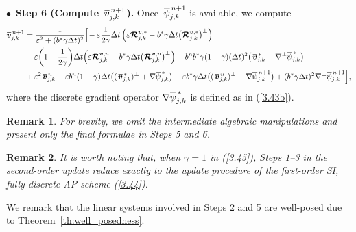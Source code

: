 \documentclass[a4paper,11pt,twoside]{article}
\newtheorem{rmk}{Remark}[section]
\numberwithin{equation}{section}
\numberwithin{figure}{section}
\numberwithin{table}{section}
\newcommand{\eps}{\varepsilon}
\newcommand{\dt}{\Delta t}
\newcommand{\bv}{\bm{v}}
\newcommand\eref[1]{(\ref{#1})}
\newcommand*\xbar[1]{%
	\hbox{%
		\vbox{%
			\hrule height 0.5pt %
			\kern0.3ex%
			\hbox{%
				\kern-0.05em%
				\ensuremath{#1}%
				\kern-0.02em%
			}%
		}%
	}%
}
\begin{document}
\smallskip
\noindent
$\bullet\,$ \textbf{Step 6 (Compute $\,\xbar{\bv}^{\,n+1}_{j,k}$).} Once $\,\xbar\psi^{\,n+1}_{j,k}$ is available, we compute
\begin{equation*}
\begin{aligned}
\xbar{\bv}^{\,n+1}_{j,k}&=\frac{1}{\eps^2+(b^*\gamma\dt)^2}\Big[\!-\eps\frac{1}{2\gamma}\dt\left(\eps\bm{{\cal R}}^{\bv,*}_{j,k}
-b^*\gamma\dt\big(\bm{{\cal R}}^{\bv,*}_{j,k}\big)^\perp\right)\\
&-\eps\bigg(1-\frac{1}{2\gamma}\bigg)\dt\Big(\eps\bm{{\cal R}}^{\bv,n}_{j,k}-b^*\gamma\dt\big(\bm{{\cal R}}^{\bv,n}_{j,k}\big)^\perp\Big)
-b^nb^*\gamma(1-\gamma)(\dt)^2\big(\,\xbar{\bv}^{\,*}_{j,k}-\nabla^\perp\xbar\psi^{\,*}_{j,k}\big)\\
&+\eps^2\,\xbar{\bv}^{\,n}_{j,k}-\eps b^n(1-\gamma)\dt\big((\,\xbar{\bv}^{\,*}_{j,k})^\perp+\nabla\xbar\psi^{\,*}_{j,k}\big)
-\eps b^*\gamma\dt\big((\,\xbar{\bv}^{\,n}_{j,k})^\perp+\nabla\xbar\psi^{\,n+1}_{j,k}\big)+
(b^*\gamma\dt)^2\nabla^\perp\xbar\psi^{\,n+1}_{j,k}\Big],
\end{aligned}
\end{equation*}
where the discrete gradient operator $\nabla\xbar\psi^{\,*}_{j,k}$ is defined as in \eref{3.43b}.
\begin{rmk}
For brevity, we omit the intermediate algebraic manipulations and present only the final formulae in Steps 5 and 6.
\end{rmk}
\begin{rmk}
It is worth noting that, when $\gamma=1$ in \eref{3.45}, Steps 1--3 in the second-order update reduce exactly to the update procedure of 
the first-order SI, fully discrete AP scheme \eref{3.44}.
\end{rmk}

\begin{remark}
	We remark that the linear systems involved in Steps 2 and 5 are well-posed due to Theorem~\ref{th:well_posedness}.
\end{remark}

\end{document}

